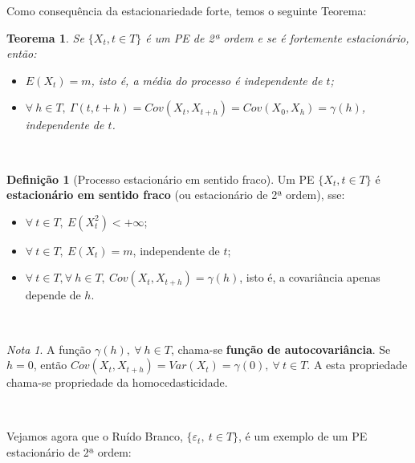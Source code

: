 \documentclass[
  11pt,
  a4paper,
]{book}
\newtheorem{theorem}{Teorema}[chapter]
\theoremstyle{definition}
\newtheorem{definition}{Definição}[chapter]
\theoremstyle{definition}
\theoremstyle{definition}
\theoremstyle{definition}
\theoremstyle{remark}
\newtheorem*{remark}{Nota }
\begin{document}
Como consequência da estacionariedade forte, temos o seguinte Teorema:

\begin{theorem}

Se \(\{X_t, t \in T\}\) é um PE de 2ª ordem e se é fortemente estacionário, então:

\begin{itemize}
\item
  \(E(X_t)=m\), isto é, a média do processo é independente de \(t\);
\item
  \(\forall ~h \in T, ~ \Gamma(t,t+h)=Cov(X_t,X_{t+h})=Cov(X_0,X_h)=\gamma(h)\),
  independente de \(t\).
\end{itemize}

\end{theorem}

\(\,\)

\begin{definition}[Processo estacionário em sentido fraco]

Um PE \(\{X_t, t \in T\}\) é \textbf{estacionário em sentido fraco} (ou estacionário de 2ª ordem),
sse:

\begin{itemize}
\item
  \(\forall ~t \in T, ~E(X^2_t)< + \infty\);
\item
  \(\forall ~t \in T, ~E(X_t)=m\), independente de \(t\);
\item
  \(\forall ~t \in T, \forall ~h \in T,  ~Cov(X_t,X_{t+h})=\gamma(h)\), isto é, a covariância
  apenas depende de \(h\).
\end{itemize}

\end{definition}

\(\,\)

\begin{remark}
A função \(\gamma(h), ~\forall ~ h \in T\), chama-se \textbf{função de autocovariância}. Se \(h=0\),
então \(Cov(X_t,X_{t+h})=Var(X_t)=\gamma(0), ~\forall ~t \in T.\) A esta propriedade chama-se
propriedade da homocedasticidade.
\end{remark}

\(\,\)

Vejamos agora que o Ruído Branco, \(\{\varepsilon_t, ~t \in T\}\), é um exemplo de um PE
estacionário de 2ª ordem:
\end{document}
